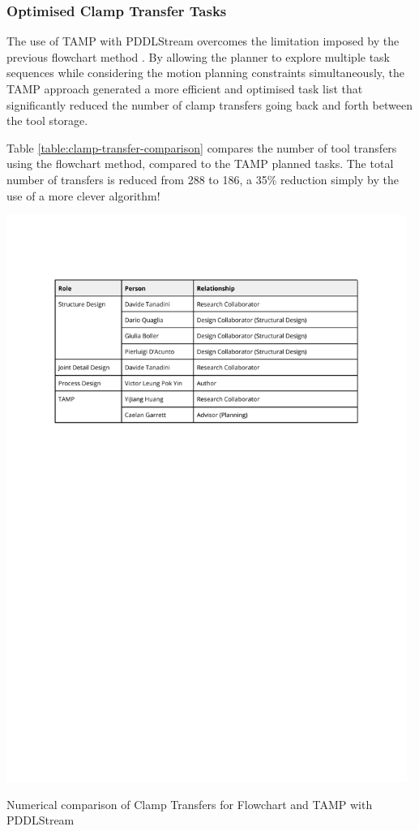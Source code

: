 \FloatBarrier

\subsubsection{Optimised Clamp Transfer Tasks}
\label{subsubsection:exploration-5-optimised-clamp-transfer-tasks}

The use of TAMP with PDDLStream overcomes the limitation imposed by the previous flowchart method . By allowing the planner to explore multiple task sequences while considering the motion planning constraints simultaneously, the TAMP approach generated a more efficient and optimised task list that significantly reduced the number of clamp transfers going back and forth between the tool storage. 

Table \ref{table:clamp-transfer-comparison} compares the number of tool transfers using the flowchart method, compared to the TAMP planned tasks. The total number of transfers is reduced from 288 to 186, a 35\% reduction simply by the use of a more clever algorithm!

\begin{table}[!h]
    \includegraphics[page=2, trim=25.4mm 200mm 25.4mm 33mm, clip, width=0.98\textwidth]{tables/Tables in Chapter 8.pdf}
    \caption{Numerical comparison of Clamp Transfers for Flowchart and TAMP with PDDLStream}
    \label{table:clamp-transfer-comparison}
\end{table}

